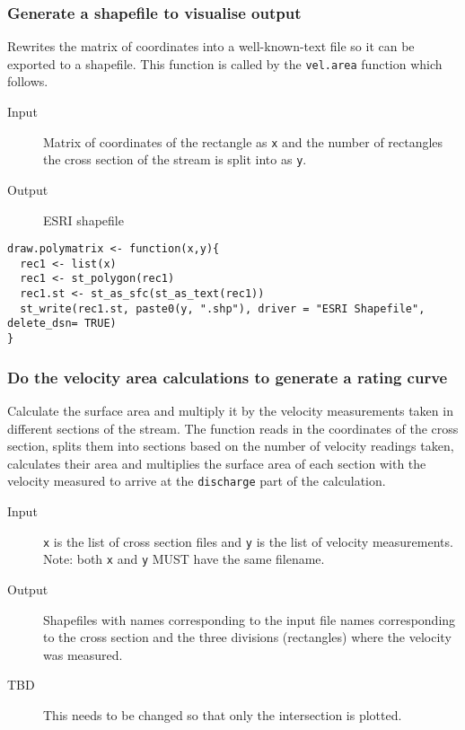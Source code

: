 \documentclass[a4paper]{article}
\begin{document}
\subsubsection*{Generate a shapefile to visualise output}
\label{sec:org72ee09d}

Rewrites the matrix of coordinates into a well-known-text file so it can be exported to a shapefile. This function is called by the \texttt{vel.area} function which follows.

\begin{description}
\item[{Input}] Matrix of coordinates of the rectangle as \texttt{x} and the number of rectangles the cross section of the stream is split into as \texttt{y}.
\item[{Output}] ESRI shapefile
\end{description}

\begin{verbatim}
draw.polymatrix <- function(x,y){
  rec1 <- list(x)
  rec1 <- st_polygon(rec1)
  rec1.st <- st_as_sfc(st_as_text(rec1))
  st_write(rec1.st, paste0(y, ".shp"), driver = "ESRI Shapefile", delete_dsn= TRUE)
}
\end{verbatim}

\subsubsection*{Do the velocity area calculations to generate a rating curve}
\label{sec:org4e0894a}

Calculate the surface area and multiply it by the velocity measurements taken in different sections of the stream. The function reads in the coordinates of the cross section, splits them into sections based on the number of velocity readings taken, calculates their area and multiplies the surface area of each section with the velocity measured to arrive at the \texttt{discharge} part of the calculation. 

\begin{description}
\item[{Input}] \texttt{x} is the list of cross section files and \texttt{y} is the list of velocity measurements. Note: both \texttt{x} and \texttt{y} MUST have the same filename.
\item[{Output}] Shapefiles with names corresponding to the input file names corresponding to the cross section and the three divisions (rectangles) where the velocity was measured.
\item[{TBD}] This needs to be changed so that only the intersection is plotted.
\end{description}
\end{document}
